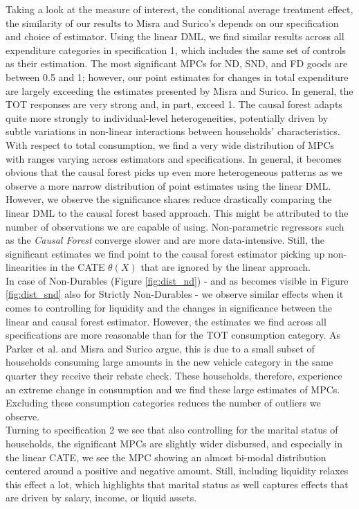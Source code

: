 Taking a look at the measure of interest, the conditional average treatment effect, the similarity of our results to Misra and Surico's depends on our specification and choice of estimator. Using the linear DML, we find similar results across all expenditure categories in specification 1, which includes the same set of controls as their estimation. The most significant MPCs for ND, SND, and FD goods are between 0.5 and 1; however, our point estimates for changes in total expenditure are largely exceeding the estimates presented by Misra and Surico. In general, the TOT responses are very strong and, in part, exceed 1. The causal forest adapts quite more strongly to individual-level heterogeneities, potentially driven by subtle variations in non-linear interactions between households’ characteristics. \\
With respect to total consumption, we find a very wide distribution of MPCs with ranges varying across estimators and specifications. In general, it becomes obvious that the causal forest picks up even more heterogeneous patterns as we observe a more narrow distribution of point estimates using the linear DML. However, we observe the significance shares reduce drastically comparing the linear DML to the causal forest based approach. This might be attributed to the number of observations we are capable of using. Non-parametric regressors such as the \textit{Causal Forest} converge slower and are more data-intensive. Still, the significant estimates we find point to the causal forest estimator picking up non-linearities in the CATE $\theta(X)$ that are ignored by the linear approach. \\
In case of Non-Durables (Figure \ref{fig:dist_nd}) - and as becomes visible in Figure \ref{fig:dist_snd} also for Strictly Non-Durables - we observe similar effects when it comes to controlling for liquidity and the changes in significance between the linear and causal forest estimator. However, the estimates we find across all specifications are more reasonable than for the TOT consumption category. As Parker et al. and Misra and Surico argue, this is due to a small subset of households consuming large amounts in the new vehicle category in the same quarter they receive their rebate check. These households, therefore, experience an extreme change in consumption and we find these large estimates of MPCs. Excluding these consumption categories reduces the number of outliers we observe. \\
Turning to specification 2 we see that also controlling for the marital status of households, the significant MPCs are slightly wider disbursed, and especially in the linear CATE, we see the MPC showing an almost bi-modal distribution centered around a positive and negative amount. Still, including liquidity relaxes this effect a lot, which highlights that marital status as well captures effects that are driven by salary, income, or liquid assets. \\ 
